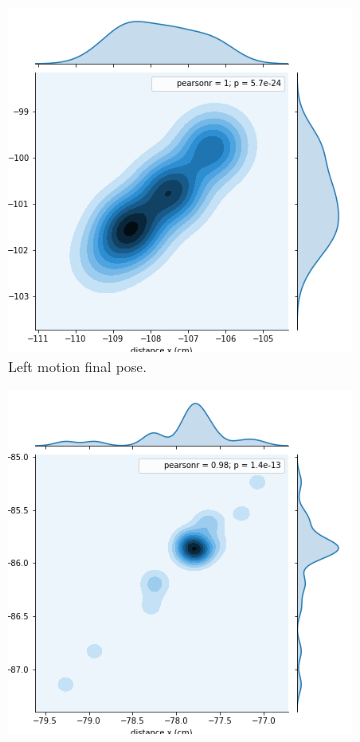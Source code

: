 \begin{figure}[ht!]
	\centering
	\begin{subfigure}[b]{0.3\textwidth}
		\includegraphics[width=\textwidth]{images/medium_left.png}
		\caption{Left motion final pose.}
		\label{distribution-right-turn}
	\end{subfigure}
	\qquad
	\begin{subfigure}[b]{0.3\textwidth}
		\includegraphics[width=\textwidth]{images/medium_straight.png}

\end{subfigure}
\end{figure}
